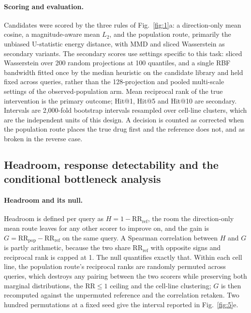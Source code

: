 \documentclass[11pt,letterpaper]{article}
\begin{document}
\paragraph{Scoring and evaluation.}
Candidates were scored by the three rules of Fig.~\ref{fig:1}a: a direction-only mean cosine, a
magnitude-aware mean $L_2$, and the population route, primarily the unbiased U-statistic energy
distance, with MMD and sliced Wasserstein as secondary variants. The secondary scores use settings
specific to this task: sliced Wasserstein over 200 random projections at 100 quantiles, and a single
RBF bandwidth fitted once by the median heuristic on the candidate library and held fixed across
queries, rather than the 128-projection and pooled multi-scale settings of the observed-population
arm. Mean reciprocal rank of the true
intervention is the primary outcome; Hit@1, Hit@5 and Hit@10 are secondary. Intervals are 2,000-fold
bootstrap intervals resampled over cell-line clusters, which are the independent units of this
design. A decision is counted as corrected when the population route places the true drug first and
the reference does not, and as broken in the reverse case.

\subsection*{Headroom, response detectability and the conditional bottleneck analysis}

\paragraph{Headroom and its null.}
Headroom is defined per query as $H=1-\mathrm{RR}_{\mathrm{ref}}$, the room the direction-only mean
route leaves for any other scorer to improve on, and the gain is
$G=\mathrm{RR}_{\mathrm{pop}}-\mathrm{RR}_{\mathrm{ref}}$ on the same query. A Spearman correlation
between $H$ and $G$ is partly arithmetic, because the two share $\mathrm{RR}_{\mathrm{ref}}$ with
opposite signs and reciprocal rank is capped at 1. The null quantifies exactly that. Within each
cell line, the population route's reciprocal ranks are randomly permuted across queries, which
destroys any pairing between the two scorers while preserving both marginal distributions, the
$\mathrm{RR}\le1$ ceiling and the cell-line clustering; $G$ is then recomputed against the
unpermuted reference and the correlation retaken. Two hundred permutations at a fixed seed give the
interval reported in Fig.~\ref{fig:5}e.
\end{document}
